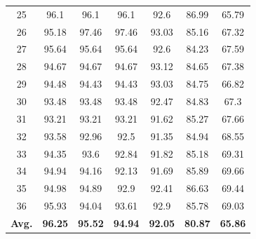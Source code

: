 \documentclass[review]{elsarticle}
\begin{document}
\begin{table}[!t]
\begin{tabular}{c|cccccc}
		25&96.1&96.1&96.1&92.6&86.99&65.79\\
		26&95.18&97.46&97.46&93.03&85.16&67.32\\
		27&95.64&95.64&95.64&92.6&84.23&67.59\\
		28&94.67&94.67&94.67&93.12&84.65&67.38\\
		29&94.48&94.43&94.43&93.03&84.75&66.82\\
		30&93.48&93.48&93.48&92.47&84.83&67.3\\
		31&93.21&93.21&93.21&91.62&85.27&67.66\\
		32&93.58&92.96&92.5&91.35&84.94&68.55\\
		33&94.35&93.6&92.84&91.82&85.18&69.31\\
		34&94.94&94.16&92.13&91.69&85.89&69.66\\
		35&94.98&94.89&92.9&92.41&86.63&69.44\\
		36&95.93&94.04&93.61&92.9&85.78&69.03\\
		\hline
		\textbf{Avg.}&\textbf{96.25}&\textbf{95.52}&\textbf{94.94}&\textbf{92.05}&\textbf{80.87}&\textbf{65.86}\\
		\hline\hline	
	\end{tabular}
\end{table}



\end{document}
